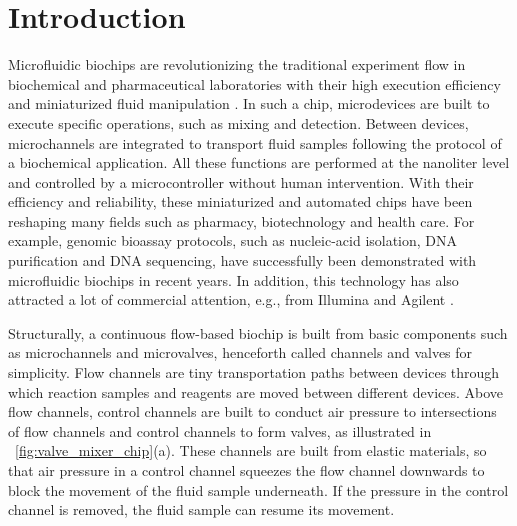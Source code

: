 \section{Introduction}

Microfluidic biochips are revolutionizing the traditional
experiment flow in biochemical and pharmaceutical laboratories  with their
high execution efficiency and miniaturized fluid manipulation 
\cite{JEMP08,JMSQ07}.  
In such a chip, microdevices are built to execute specific
operations, such as mixing and detection.  Between devices, microchannels are
integrated to transport fluid samples following the protocol of a biochemical application.
All these functions are performed at the nanoliter level and controlled by a
microcontroller without human intervention.  With their efficiency and
reliability, these miniaturized and automated chips 
have been reshaping many fields such as pharmacy, biotechnology and health
care.  For example, genomic bioassay protocols, such as nucleic-acid
isolation, DNA purification and DNA sequencing, have successfully been
demonstrated with microfluidic biochips in recent years.  In addition, this
technology has also attracted a lot of commercial attention, e.g., from
Illumina \cite{illum} and Agilent \cite{agilent}.

Structurally, a continuous flow-based biochip is built from basic components
such as microchannels and microvalves, henceforth called channels and valves
for simplicity.  Flow channels are tiny transportation paths between devices
through which reaction samples and reagents are moved between different
devices.  Above flow channels, control channels are built to conduct air
pressure to intersections of flow channels and control channels to form
valves, as illustrated in \figname~\ref{fig:valve_mixer_chip}(a).  These
channels are built from elastic materials, so that air pressure in a control
channel squeezes the flow channel downwards to block the movement of the fluid
sample underneath.  If the pressure in the control channel is removed, the
fluid sample can resume its movement. 

